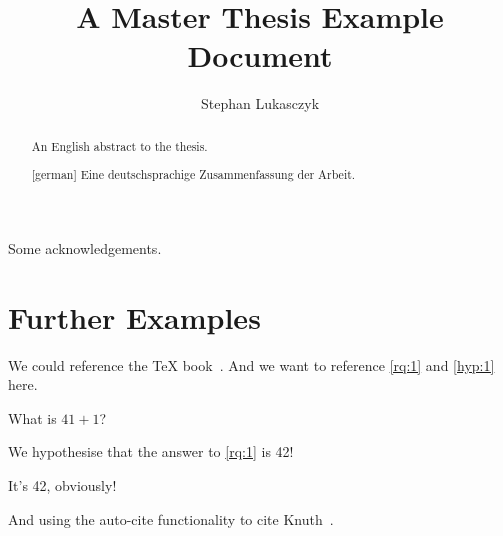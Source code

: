 \documentclass[%
  chapterprefix=false,%
  open=right,%
  twoside=true,%
  paper=a4,%
  logofile={logo.pdf},%
  thesistype=master,%
  UKenglish,%
]{se2thesis}
\author{Stephan Lukasczyk}
\title{A Master Thesis Example Document}
\institute{Chair of Example}
\begin{document}
\frontmatter

\maketitle

\authorshipDeclaration

\begin{abstract}
  An English abstract to the thesis.
\end{abstract}

\begin{abstract}[german]
  Eine deutschsprachige Zusammenfassung der Arbeit.
\end{abstract}

\begin{acknowledgements}
  Some acknowledgements.
\end{acknowledgements}

\tableofcontents

\mainmatter

\blinddocument

\section{Further Examples}

We could reference the \TeX{} book~\autocite{Knu86}.  And we want to reference
\cref{rq:1} and \cref{hyp:1} here.

\begin{resq}\label{rq:1}
    What is \(41 + 1\)?
\end{resq}

\begin{hyp}\label{hyp:1}
  We hypothesise that the answer to \cref{rq:1} is 42!
\end{hyp}

\begin{summary}{}
   It's 42, obviously!
\end{summary}

And using the auto-cite functionality to cite Knuth~\autocite{Knu86}.

\backmatter

\printbibliography
\end{document}
